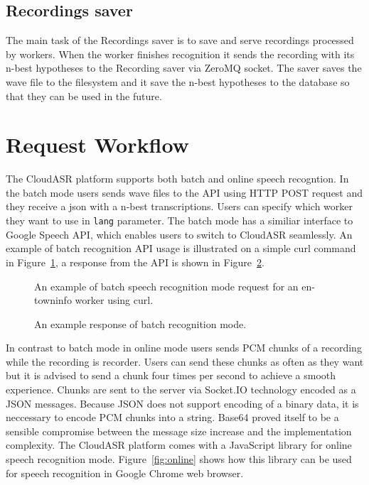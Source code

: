 


\subsection{Recordings saver}
The main task of the Recordings saver is to save and serve recordings processed by workers.
When the worker finishes recognition it sends the recording with its n-best hypotheses to the Recording saver via ZeroMQ socket.
The saver saves the wave file to the filesystem and it save the n-best hypotheses to the database so that they can be used in the future.



\section{Request Workflow}
The CloudASR platform supports both batch and online speech recogntion.
In the batch mode users sends wave files to the API using HTTP POST request
  and they receive a json with a n-best transcriptions.
Users can specify which worker they want to use in \texttt{lang} parameter.
The batch mode has a similiar interface to Google Speech API,
  which enables users to switch to CloudASR seamlessly.
An example of batch recognition API usage is illustrated on a simple curl command in Figure~\ref{fig:curl},
  a response from the API is shown in Figure~\ref{fig:curl-response}.

\begin{figure}[h]
  

  \caption{An example of batch speech recognition mode request for an en-towninfo worker using curl.}
  \label{fig:curl}
\end{figure}

\begin{figure}[h]
  

  \caption{An example response of batch recognition mode.}
  \label{fig:curl-response}
\end{figure}

In contrast to batch mode in online mode users sends PCM chunks of a recording while the recording is recorder.
Users can send these chunks as often as they want
  but it is advised to send a chunk four times per second
  to achieve a smooth experience.
Chunks are sent to the server via Socket.IO technology encoded as a JSON messages.
Because JSON does not support encoding of a binary data,
  it is neccessary to encode PCM chunks into a string.
Base64 proved itself to be a sensible compromise between the message size increase
  and the implementation complexity.
The CloudASR platform comes with a JavaScript library for online speech recognition mode.
Figure~\ref{fig:online} shows how this library can be used for speech recognition in Google Chrome web browser.

